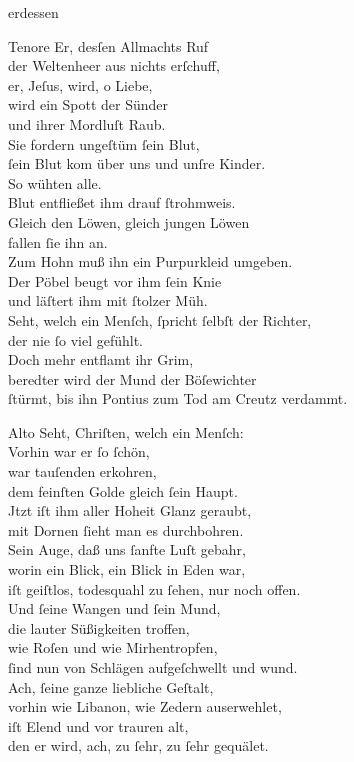 \documentclass[shorttitlesize=55,tocstyle=ref-genre]{ees}
\begin{document}
{\begin{movement}{erdessen}
  \item[Tenore]
  Er, desſen Allmachts Ruf\\
  der Weltenheer aus nichts erſchuff,\\
  er, Jeſus, wird, o Liebe,\\
  wird ein Spott der Sünder\\
  und ihrer Mordluſt Raub.\\
  Sie fordern ungeſtüm ſein Blut,\\
  ſein Blut kom über uns und unſre Kinder.\\
  So wühten alle.\\
  Blut entfließet ihm drauf ſtrohmweis.\\
  Gleich den Löwen, gleich jungen Löwen\\
  fallen ſie ihn an.\\
  Zum Hohn muß ihn ein Purpurkleid umgeben.\\
  Der Pöbel beugt vor ihm ſein Knie\\
  und läſtert ihm mit ſtolzer Müh.\\
  Seht, welch ein Menſch, ſpricht ſelbſt der Richter,\\
  der nie ſo viel gefühlt.\\
  Doch mehr entflamt ihr Grim,\\
  beredter wird der Mund der Böſewichter\\
  ſtürmt, bis ihn Pontius zum Tod am Creutz verdammt.

  \item[Alto]
  Seht, Chriſten, welch ein Menſch:\\
  Vorhin war er ſo ſchön,\\
  war tauſenden erkohren,\\
  dem feinſten Golde gleich ſein Haupt.\\
  Jtzt iſt ihm aller Hoheit Glanz geraubt,\\
  mit Dornen ſieht man es durchbohren.\\
  Sein Auge, daß uns ſanfte Luſt gebahr,\\
  worin ein Blick, ein Blick in Eden war,\\
  iſt geiſtlos, todesquahl zu ſehen, nur noch offen.\\
  Und ſeine Wangen und ſein Mund,\\
  die lauter Süßigkeiten troffen,\\
  wie Roſen und wie Mirhentropfen,\\
  ſind nun von Schlägen aufgeſchwellt und wund.\\
  Ach, ſeine ganze liebliche Geſtalt,\\
  vorhin wie Libanon, wie Zedern auserwehlet,\\
  iſt Elend und vor trauren alt,\\
  den er wird, ach, zu ſehr, zu ſehr gequälet.
\end{movement}

}
\end{document}

